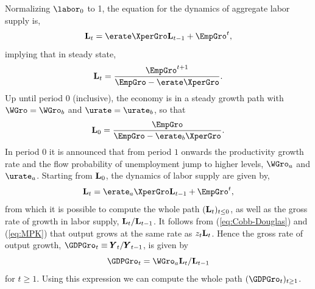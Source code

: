 \documentclass[titlepage]{\econtex}\newcommand{\texname}{cjSOE}
\renewcommand{\GDPLev}{\ensuremath{\pmb{Y}}}
\begin{document}
Normalizing $\labor_0$ to 1, the equation for the dynamics of aggregate labor supply is,
\begin{equation*}
\LLev_t=\erate \XperGro \LLev_{t-1}+\EmpGro^t,
\end{equation*}
implying that in steady state,
\begin{equation*}
\LLev_t = \frac{\EmpGro^{t+1}}{\EmpGro-\erate \XperGro}.
\end{equation*}
Up until period $0$ (inclusive), the economy is in a steady growth path with $\WGro=\WGro_b$ and $\urate=\urate_b$, so that
\begin{equation*}
\LLev_0=\frac{\EmpGro}{\EmpGro-\erate_b \XperGro}.
\end{equation*}
In period $0$ it is announced that from period $1$ onwards the productivity growth rate and the flow probability of unemployment jump to higher levels, $\WGro_a$ and $\urate_a$. Starting from $\mathbf{L}_0$, the dynamics of labor supply are given by,
\begin{equation*}
\LLev_t=\erate_a \XperGro \LLev_{t-1}+\EmpGro^t,
\end{equation*}
from which it is possible to compute the whole path $(\mathbf{L}_t)_{t\leq0}$, as well as the gross rate of growth in labor supply, $\mathbf{L}_t/\mathbf{L}_{t-1}$. It follows from (\ref{eq:Cobb-Douglas}) and (\ref{eq:MPK}) that output grows at the same rate as $z_t \mathbf{L}_t$. Hence the gross rate of output growth, $\GDPGro_{t} \equiv \GDPLev_t/\GDPLev_{t-1}$, is given by
\begin{equation*}
\GDPGro_{t}=\WGro_a \LLev_t/\LLev_{t-1}
\end{equation*}
for $t \geq 1$. Using this expression we can compute the whole path $(\GDPGro_{t})_{t \geq 1}$.
\end{document}
